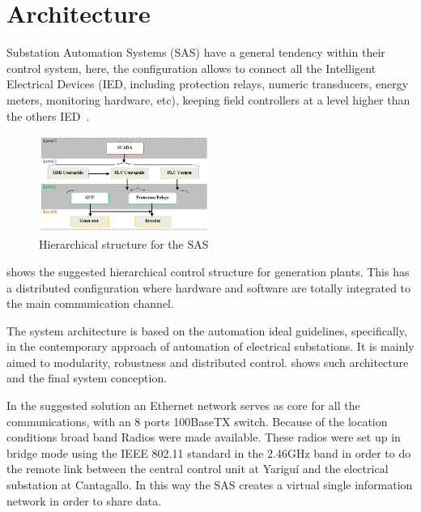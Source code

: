 
\section{Architecture}

Substation Automation Systems (SAS) have a general tendency
within their control system, here, the configuration allows to connect
all the Intelligent Electrical Devices (IED, including protection relays,
numeric transducers, energy meters, monitoring hardware, etc), keeping
field controllers at a level higher than the others
IED~\cite{rodriguez:2007}.

\begin{figure}
  \centering
  \includegraphics[width=0.5\textwidth]{img/sas.png}
  \caption{Hierarchical structure for the SAS}
  \label{fig:sas}
\end{figure}

 shows the suggested hierarchical control structure for
generation plants. This has a distributed configuration where hardware
and software are totally integrated to the main communication channel.

The system architecture is based on the automation ideal guidelines,
specifically, in the contemporary approach of automation of electrical
substations. It is mainly aimed to modularity, robustness and distributed
control.  shows such architecture and the final system
conception.

In the suggested solution an Ethernet network serves as core for all
the communications, with an 8 ports 100BaseTX switch. Because of the
location conditions broad band Radios were made available. These radios 
were set up in bridge mode using the IEEE 802.11 standard in the 2.46GHz 
band in order to do the remote link between the central control unit at
Yariguí and the electrical substation at Cantagallo. In this way the SAS
creates a virtual single information network in order to share data.

